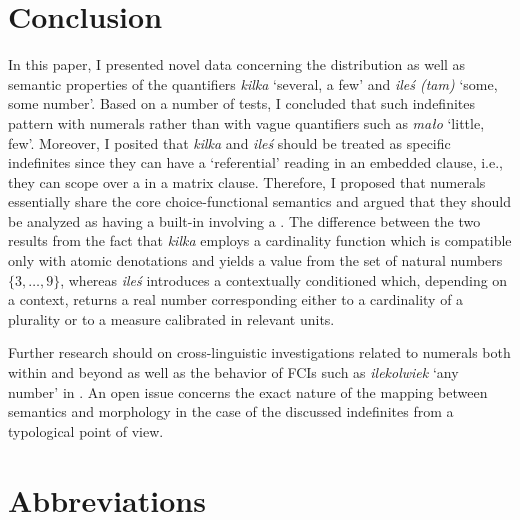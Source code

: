 \documentclass[output=paper, newtxmath, colorlinks, citecolor=brown]{langsci/langscibook}
\begin{document}
	\section{Conclusion}\label{sec:conclusion}

	In this paper, I presented novel data concerning the distribution as well as semantic properties of the   quantifiers \textit{kilka} `several, a few' and \textit{ileś (tam)} `some, some number'. Based on a number of tests, I concluded that such indefinites pattern with  numerals rather than with vague quantifiers such as \textit{mało} `little, few'. Moreover, I posited that \textit{kilka} and \textit{ileś} should be treated as specific indefinites since they can have a `referential' reading in an embedded clause, i.e., they can scope over a  in a matrix clause. Therefore, I proposed that   numerals essentially share the core choice-functional semantics and argued that they should be analyzed as having a built-in  involving a . The difference between the two results from the fact that \textit{kilka} employs a cardinality function which is compatible only with atomic denotations and yields a value from the set of natural numbers $\{3,\dots,9\}$, whereas \textit{ileś} introduces a contextually conditioned  which, depending on a context, returns a real number corresponding either to a cardinality of a plurality or to a measure calibrated in relevant units.

	Further research should  on cross-linguistic investigations related to  numerals both within  and beyond as well as the behavior of FCIs such as \textit{ilekolwiek} `any number' in . An open issue concerns the exact nature of the mapping between semantics and morphology in the case of the discussed indefinites from a typological point of view.

	\section*{Abbreviations}
\end{document}
